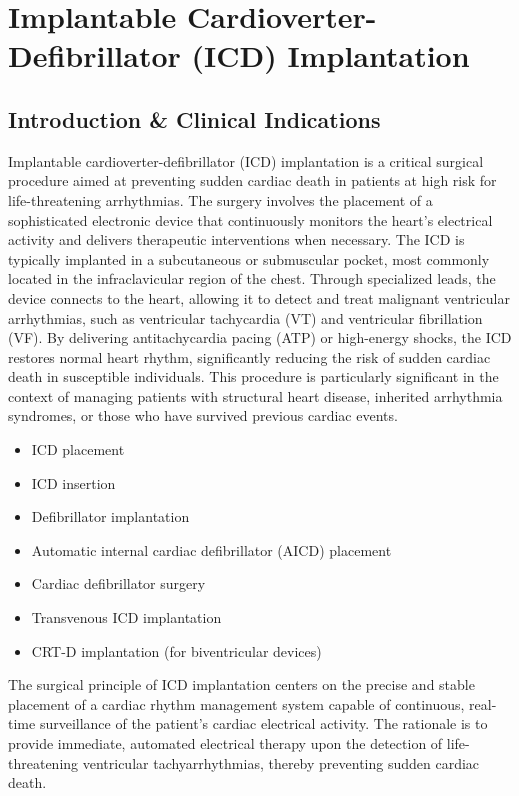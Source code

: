 \chapter{Implantable Cardioverter-Defibrillator (ICD) Implantation}

\section*{Introduction \& Clinical Indications}
Implantable cardioverter-defibrillator (ICD) implantation is a critical surgical procedure aimed at preventing sudden cardiac death in patients at high risk for life-threatening arrhythmias. The surgery involves the placement of a sophisticated electronic device that continuously monitors the heart's electrical activity and delivers therapeutic interventions when necessary. The ICD is typically implanted in a subcutaneous or submuscular pocket, most commonly located in the infraclavicular region of the chest. Through specialized leads, the device connects to the heart, allowing it to detect and treat malignant ventricular arrhythmias, such as ventricular tachycardia (VT) and ventricular fibrillation (VF). By delivering antitachycardia pacing (ATP) or high-energy shocks, the ICD restores normal heart rhythm, significantly reducing the risk of sudden cardiac death in susceptible individuals. This procedure is particularly significant in the context of managing patients with structural heart disease, inherited arrhythmia syndromes, or those who have survived previous cardiac events.

\begin{itemize}
  \item ICD placement
  \item ICD insertion
  \item Defibrillator implantation
  \item Automatic internal cardiac defibrillator (AICD) placement
  \item Cardiac defibrillator surgery
  \item Transvenous ICD implantation
  \item CRT-D implantation (for biventricular devices)
\end{itemize}

The surgical principle of ICD implantation centers on the precise and stable placement of a cardiac rhythm management system capable of continuous, real-time surveillance of the patient's cardiac electrical activity. The rationale is to provide immediate, automated electrical therapy upon the detection of life-threatening ventricular tachyarrhythmias, thereby preventing sudden cardiac death. 

